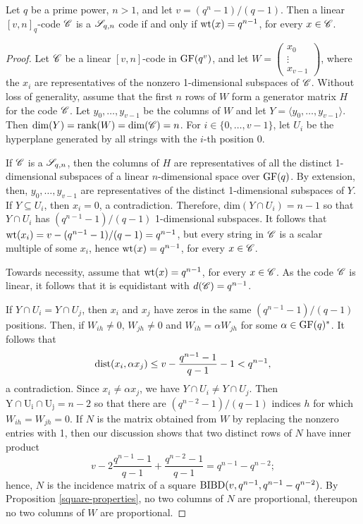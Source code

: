 \documentclass[../../../main]{subfiles}
\begin{document}
\begin{thm}\label{simplex-properties}
 Let $q$ be a prime power, $n>1$, and let $v=(q^n-1)/(q-1)$. Then a linear $[v,n]_q$-code $\mathscr{C}$ is a $\mathscr{S}_{q,n}$ code if and only if $\text{wt}(x)=q^{n-1}$, for every $x \in \mathscr{C}$.
\end{thm}

\begin{proof}
 Let $\mathscr{C}$ be a linear $[v,n]$-code in $\text{GF}(q^v)$, and let $W=\left( \begin{smallmatrix} x_0 \\\hline \vdots \\\hline x_{v-1} \end{smallmatrix} \right)$, where the $x_i$ are representatives of the nonzero 1-dimensional subspaces of $\mathscr{C}$. Without loss of generality, assume that the first $n$ rows of $W$ form a generator matrix $H$ for the code $\mathscr{C}$. Let $y_0, \dots, y_{v-1}$ be the columns of $W$ and let $Y = \langle y_0, \dots, y_{v-1} \rangle$. Then $\mathrm{dim}(Y)=\mathrm{rank}(W)=\mathrm{dim}(\mathscr{C})=n$. For $i \in \{0,\dots, v-1\}$, let $U_i$ be the hyperplane generated by all strings with the $i$-th position 0.
 
 If $\mathscr{C}$ is a $\mathscr{S}_{q,n}$, then the columns of $H$ are representatives of all the distinct 1-dimensional subspaces of a linear $n$-dimensional space over $\text{GF}(q)$. By extension, then, $y_0, \dots, y_{v-1}$ are representatives of the distinct 1-dimensional subspaces of $Y$. If $Y \subseteq U_i$, then $x_i=0$, a contradiction. Therefore, $\mathrm{dim}(Y \cap U_i) = n-1$ so that $Y \cap U_i$ has $(q^{n-1}-1)/(q-1)$ 1-dimensional subspaces. It follows that $\text{wt}(x_i) = v - (q^{n-1}-1)/(q-1) = q^{n-1}$, but every string in $\mathscr{C}$ is a scalar multiple of some $x_i$, hence $\text{wt}(x) = q^{n-1}$, for every $x \in \mathscr{C}$.
 
 Towards necessity, assume that $\text{wt}(x)=q^{n-1}$, for every $x \in \mathscr{C}$. As the code $\mathscr{C}$ is linear, it follows that it is equidistant with $d(\mathscr{C})=q^{n-1}$. 
 
 If $Y \cap U_i = Y \cap U_j$, then $x_i$ and $x_j$ have zeros in the same $(q^{n-1}-1)/(q-1)$ positions. Then, if $W_{ih} \neq 0$, $W_{jh} \neq 0$ and $W_{ih}=\alpha W_{jh}$ for some $\alpha \in \text{GF}(q)^*$. It follows that
 \[
 \text{dist}(x_i, \alpha x_j) \leq v - \frac{q^{n-1}-1}{q-1} -1 < q^{n-1},
 \]
 a contradiction. Since $x_i \neq \alpha x_j$, we have $Y \cap U_i \neq Y \cap U_j$. Then $\mathrm{Y \cap U_i \cap U_j} = n-2$ so that there are $(q^{n-2}-1)/(q-1)$ indices $h$ for which $W_{ih} = W_{jh} = 0$. If $N$ is the matrix obtained from $W$ by replacing the nonzero entries with 1, then our discussion shows that two distinct rows of $N$ have inner product 
 \[
 v - 2\frac{q^{n-1}-1}{q-1} + \frac{q^{n-2}-1}{q-1} = q^{n-1}-q^{n-2};
 \]
 hence, $N$ is the incidence matrix of a square $\text{BIBD}(v,q^{n-1},q^{n-1}-q^{n-2})$. By Proposition \ref{square-properties}, no two columns of $N$ are proportional, thereupon no two columns of $W$ are proportional.
 

\end{proof}
\end{document}
